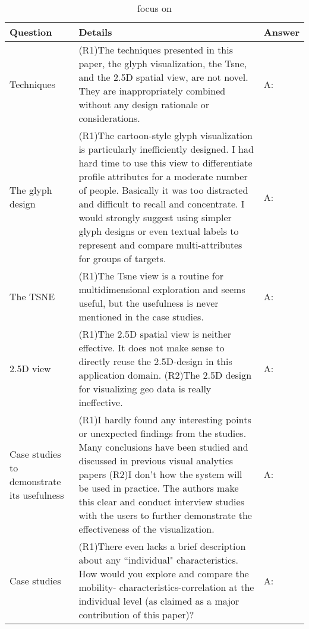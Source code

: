 \documentclass[UTF8]{article}
\begin{document}
\begin{table}[h]
\centering
\caption{focus on}
    \begin{tabular}{|p{4cm}|p{9cm}|p{4cm}|}
    \hline
    Question & Details & Answer\\
    \hline
    Techniques & (R1)The techniques presented in this paper, the glyph visualization, the Tsne, and the 2.5D spatial view, are not novel. They are inappropriately combined without any design rationale or considerations.\newline & A:\color{red}{Modifying.}\\
  
    The glyph design & (R1)The cartoon-style glyph visualization is particularly inefficiently designed. I had hard time to use this view to differentiate profile attributes for a moderate number of people. Basically it was too distracted and difficult to recall and concentrate. I would strongly suggest using simpler glyph designs or even textual labels to represent and compare multi-attributes for groups of targets.\newline & A:\color{red}{Add a radar chart for groups.}\\

    The TSNE & (R1)The Tsne view is a routine for multidimensional exploration and seems useful, but the usefulness is never mentioned in the case studies.\newline & A:\color{red}{Modifying.}\\

    2.5D view & (R1)The 2.5D spatial view is neither effective. It does not make sense to directly reuse the 2.5D-design in this application domain. (R2)The 2.5D design for visualizing geo data is really ineffective.\newline & A:\color{red}{Modifying.}\\

    Case studies to demonstrate its usefulness & (R1)I hardly found any interesting points or unexpected findings from the studies. Many conclusions have been studied and discussed in previous visual analytics papers  (R2)I don't how the system will be used in practice. The authors make this clear and conduct interview studies with the users to further demonstrate the effectiveness of the visualization.\newline & A:\color{red}{Modifying.}\\

    Case studies & (R1)There even lacks a brief description about any ``individual" characteristics. How would you explore and compare the mobility- characteristics-correlation at the individual level (as claimed as a major contribution of this paper)?\newline & A:\color{red}{Modifying.}\\


\end{tabular}
\end{table}
\end{document}
